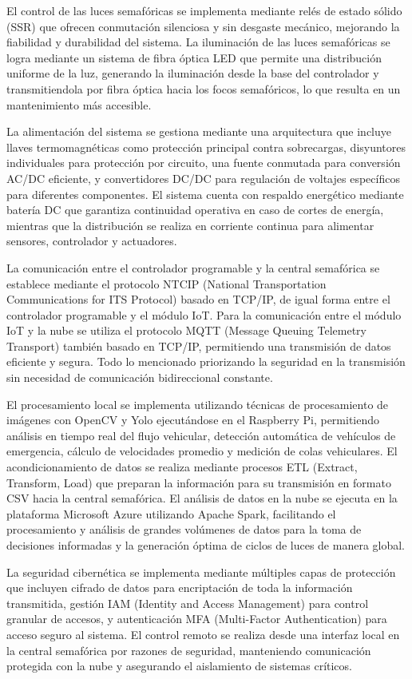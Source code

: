 \documentclass[12pt,a4paper,oneside]{report}
\begin{document}
El control de las luces semafóricas se implementa mediante relés de estado sólido (SSR) que ofrecen conmutación silenciosa y sin desgaste mecánico, mejorando la fiabilidad y durabilidad del sistema. La iluminación de las luces semafóricas se logra mediante un sistema de fibra óptica LED que permite una distribución uniforme de la luz, generando la iluminación desde la base del controlador y transmitiendola por fibra óptica hacia los focos semafóricos, lo que resulta en un mantenimiento más accesible.

La alimentación del sistema se gestiona mediante una arquitectura que incluye llaves termomagnéticas como protección principal contra sobrecargas, disyuntores individuales para protección por circuito, una fuente conmutada para conversión AC/DC eficiente, y convertidores DC/DC para regulación de voltajes específicos para diferentes componentes. El sistema cuenta con respaldo energético mediante batería DC que garantiza continuidad operativa en caso de cortes de energía, mientras que la distribución se realiza en corriente continua para alimentar sensores, controlador y actuadores.

La comunicación entre el controlador programable y la central semafórica se establece mediante el protocolo NTCIP (National Transportation Communications for ITS Protocol) basado en TCP/IP, de igual forma entre el controlador programable y el módulo IoT. Para la comunicación entre el módulo IoT y la nube se utiliza el protocolo MQTT (Message Queuing Telemetry Transport) también basado en TCP/IP, permitiendo una transmisión de datos eficiente y segura. Todo lo mencionado priorizando la seguridad en la transmisión sin necesidad de comunicación bidireccional constante.

El procesamiento local se implementa utilizando técnicas de procesamiento de imágenes con OpenCV y Yolo ejecutándose en el Raspberry Pi, permitiendo análisis en tiempo real del flujo vehicular, detección automática de vehículos de emergencia, cálculo de velocidades promedio y medición de colas vehiculares. El acondicionamiento de datos se realiza mediante procesos ETL (Extract, Transform, Load) que preparan la información para su transmisión en formato CSV hacia la central semafórica. El análisis de datos en la nube se ejecuta en la plataforma Microsoft Azure utilizando Apache Spark, facilitando el procesamiento y análisis de grandes volúmenes de datos para la toma de decisiones informadas y la generación óptima de ciclos de luces de manera global.

La seguridad cibernética se implementa mediante múltiples capas de protección que incluyen cifrado de datos para encriptación de toda la información transmitida, gestión IAM (Identity and Access Management) para control granular de accesos, y autenticación MFA (Multi-Factor Authentication) para acceso seguro al sistema. El control remoto se realiza desde una interfaz local en la central semafórica por razones de seguridad, manteniendo comunicación protegida con la nube y asegurando el aislamiento de sistemas críticos.
\end{document}

